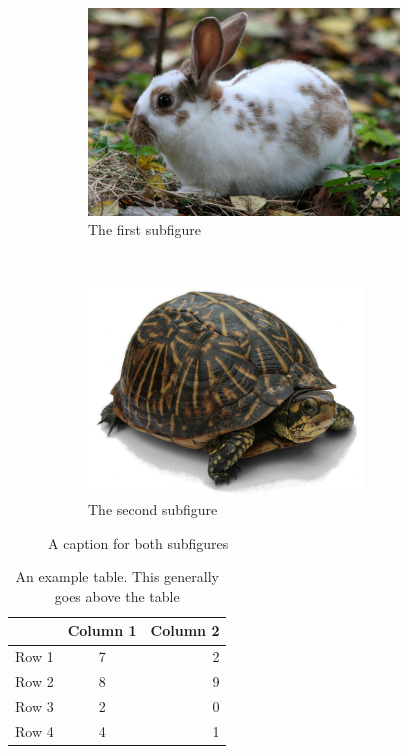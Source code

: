 \documentclass[11pt, twoside]{article}
\begin{document}
\begin{figure}[H]
    \centering
    \begin{subfigure}{0.47\textwidth}
        \includegraphics[height=5.5cm]{figures/rabbit.jpg}
        \caption{The first subfigure}
    \end{subfigure}
    ~
    \begin{subfigure}{0.47\textwidth}
        \includegraphics[height=5.5cm]{figures/turtle.jpg}
        \caption{The second subfigure}
        \label{fig:turtle}
    \end{subfigure}
    \caption{A caption for both subfigures}
\end{figure}



\begin{table}[h]
    \centering
    \caption{An example table. This generally goes above the table}
    \begin{tabular}{|l|cr|}
        \hline
              & Column 1 & Column 2 \\
        \hline
        Row 1 & 7        & 2        \\
        Row 2 & 8        & 9        \\
        Row 3 & 2        & 0        \\
        Row 4 & 4        & 1        \\
        \bottomrule
    \end{tabular}
\end{table}
\end{document}

